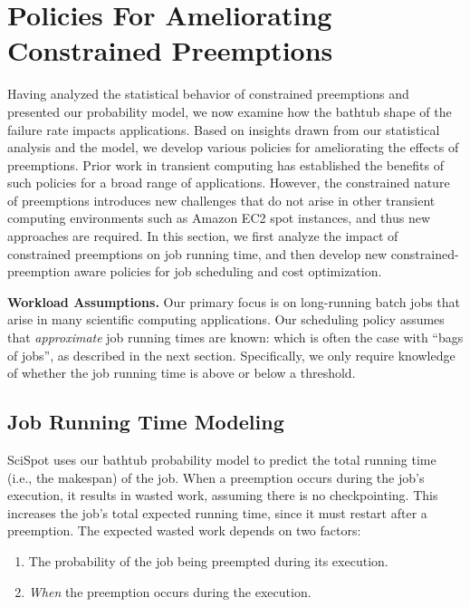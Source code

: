 \documentclass[compsoc]{IEEEtran}
\newcommand{\subsecspace}[0]{-0.20cm}
\begin{document}
 
\vspace*{\subsecspace}
\section{Policies For Ameliorating Constrained Preemptions}
\label{sec:policies}
Having analyzed the statistical behavior of constrained preemptions and presented our probability model, we now examine how the bathtub shape of the failure rate impacts applications. 
Based on insights drawn from our statistical analysis and the model, we develop various policies for ameliorating the effects of preemptions. 
Prior work in transient computing has established the benefits of such policies for a broad range of applications. 
However, the constrained nature of preemptions introduces new challenges that do not arise in other transient computing environments such as Amazon EC2 spot instances, and thus new approaches are required. 
In this section, we first analyze the impact of constrained preemptions on job running time, and then develop new constrained-preemption aware policies for job scheduling and cost optimization. 


\noindent \textbf{Workload Assumptions.}
Our primary focus is on long-running batch jobs that arise in many scientific computing applications. 
Our scheduling policy assumes that \emph{approximate} job running times are known: which is often the case with ``bags of jobs'', as described in the next section. 
Specifically, we only require knowledge of whether the job running time is above or below a threshold.









\vspace*{\subsecspace}
\subsection{Job Running Time Modeling}

SciSpot uses our bathtub probability model to predict the total running time (i.e., the makespan) of the job. 
When a preemption occurs during the job's execution, it results in wasted work, assuming there is no checkpointing. 
This increases the job's total expected running time, since it must restart after a preemption.
The expected wasted work depends on two factors:
\begin{enumerate} [leftmargin=12pt]
\item The probability of the job being preempted during its execution. 
\item \emph{When} the preemption occurs during the execution. 
\end{enumerate}
\end{document}
